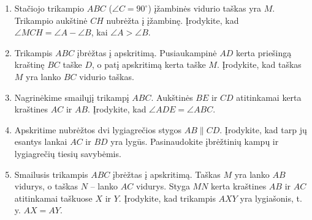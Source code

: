 \documentclass[11pt,a4paper]{scrartcl}
\begin{document}
\begin{enumerate}
    \item Stačiojo trikampio $ABC$ ($\angle C=90^\circ$) įžambinės vidurio taškas yra $M$. Trikampio aukštinė $CH$ nubrėžta į įžambinę. Įrodykite, kad $\angle MCH=\angle A-\angle B$, kai $\angle A>\angle B$.
    \item Trikampis $ABC$ įbrėžtas į apskritimą. Pusiaukampinė $AD$ kerta priešingą kraštinę $BC$ taške $D$, o patį apskritimą kerta taške $M$. Įrodykite, kad taškas $M$ yra lanko $BC$ vidurio taškas.
    \item Nagrinėkime smailųjį trikampį $ABC$. Aukštinės $BE$ ir $CD$ atitinkamai kerta kraštines $AC$ ir $AB$. Įrodykite, kad $\angle ADE=\angle ABC$.
    \item Apskritime nubrėžtos dvi lygiagrečios stygos $AB\parallel CD$. Įrodykite, kad tarp jų esantys lankai $AC$ ir $BD$ yra lygūs. Pasinaudokite įbrėžtinių kampų ir lygiagrečių tiesių savybėmis.
    \item Smailusis trikampis $ABC$ įbrėžtas į apskritimą. Taškas $M$ yra lanko $AB$ vidurys, o taškas $N$ – lanko $AC$ vidurys. Styga $MN$ kerta kraštines $AB$ ir $AC$ atitinkamai taškuose $X$ ir $Y$. Įrodykite, kad trikampis $AXY$ yra lygiašonis, t. y. $AX=AY$.
\end{enumerate}
\end{document}
